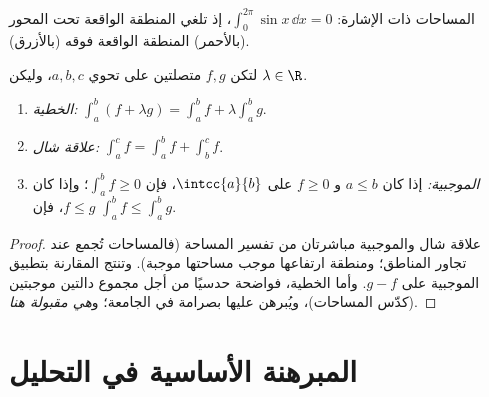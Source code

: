 \begin{omfigure}

{\small المساحات ذات الإشارة: $\int_0^{2\pi} \sin x\,\dd x = 0$، إذ تلغي المنطقة
الواقعة تحت المحور (بالأحمر) المنطقة الواقعة فوقه (بالأزرق).}
\end{omfigure}

\begin{proposition}\label{prop:g12:integ:properties}
لتكن $f, g$ متصلتين على  تحوي $a, b, c$، وليكن
$\lambda \in \R$.
\begin{enumerate}
  \item \emph{الخطية:}
        $\displaystyle\int_a^b (f + \lambda g) = \int_a^b f + \lambda \int_a^b g$.
  \item \emph{علاقة شال:}
        $\displaystyle\int_a^c f = \int_a^b f + \int_b^c f$.
  \item \emph{الموجبية:} إذا كان $a \leq b$ و $f \geq 0$ على $\intcc{a}{b}$،
        فإن $\displaystyle\int_a^b f \geq 0$؛ وإذا كان $f \leq g$، فإن
        $\displaystyle\int_a^b f \leq \int_a^b g$.
\end{enumerate}
\end{proposition}

\begin{proof}
علاقة شال والموجبية مباشرتان من تفسير المساحة (فالمساحات تُجمع
عند تجاور المناطق؛ ومنطقة ارتفاعها موجب مساحتها
موجبة). وتنتج المقارنة بتطبيق الموجبية على $g - f$. وأما الخطية،
فواضحة حدسيًا من أجل مجموع دالتين موجبتين (كدّس المساحات)، ويُبرهن
عليها بصرامة في الجامعة؛ و\emph{هي مقبولة هنا}.
\end{proof}

\section{المبرهنة الأساسية في التحليل}

